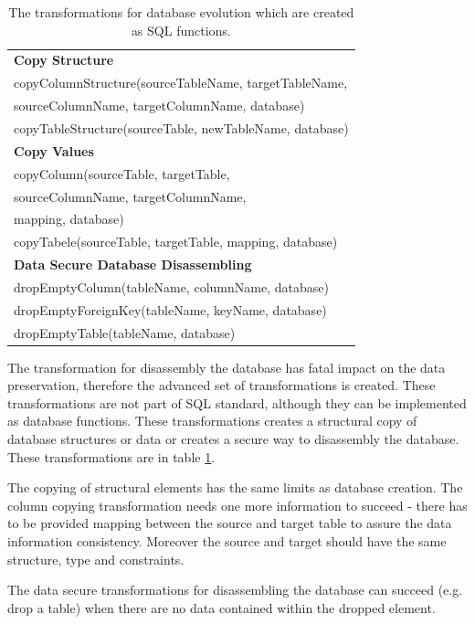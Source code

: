 \documentclass[11pt]{article}
\begin{document}
\begin{table}
\centering
	\begin{tabular}{|l|}
	\hline
	\textbf{Copy Structure} \\
	copyColumnStructure(sourceTableName, targetTableName, \\  \hspace{1in} sourceColumnName, targetColumnName, database) \\
	copyTableStructure(sourceTable, newTableName, database) \\
	\textbf{Copy Values} \\
	copyColumn(sourceTable, targetTable, \\
	\hspace{1in} sourceColumnName, targetColumnName, \\ 
	\hspace{1in} mapping, database) \\
	copyTabele(sourceTable, targetTable, mapping,  database) \\
	\textbf{Data Secure Database Disassembling} \\
	dropEmptyColumn(tableName, columnName, database) \\
	dropEmptyForeignKey(tableName, keyName, database) \\
	dropEmptyTable(tableName, database) \\
	\hline
	\end{tabular}
	\caption{The transformations for database evolution which are created as SQL functions.}
	\label{tab:db-adv-evolution}
\end{table}


The transformation for disassembly the database has fatal impact on the data preservation, therefore the advanced set of transformations is created. These transformations are not part of SQL standard, although they can be implemented as database functions. These transformations creates a structural copy of database structures or data or creates a secure way to disassembly the database. These transformations are in table \ref{tab:db-adv-evolution}. 

The copying of structural elements has the same limits as database creation. The column copying transformation needs one more information to succeed - there has to be provided mapping between the source and target table to assure the data information consistency. Moreover the source and target should have the same structure, type and constraints. 

The data secure transformations for disassembling the database can succeed (e.g. drop a table) when there are no data contained within the dropped element.
\end{document}
